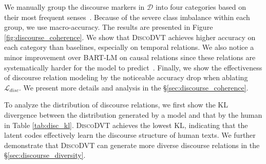 \documentclass[11pt]{article}
\begin{document}

We manually group the discourse markers in $\mathcal{D}$ into four categories based on their most frequent senses~\citep{pdtb2}. Because of the severe class imbalance within each group, we use macro-accuracy.
The results are presented in Figure \ref{fig:discourse_coherence}. We show that \textsc{DiscoDVT} achieves higher accuracy on each category than baselines, especially on temporal relations. We also notice a minor improvement over BART-LM on causal relations since these relations are systematically harder for the model to predict~\citep{DisSent}. Finally, we show the effectiveness of discourse relation modeling by the noticeable accuracy drop when ablating $\mathcal{L}_{disc}$.
We present more details and analysis in the \S{\ref{sec:discourse_coherence}}.

To analyze the distribution of discourse relations, we first show the KL divergence between the distribution generated by a model and that by the human in Table \ref{tab:disc_kl}. \textsc{DiscoDVT} achieves the lowest KL, indicating that the latent codes effectively learn the discourse structure of human texts. We further demonstrate that \textsc{DiscoDVT} can generate more diverse discourse relations in the \S{\ref{sec:discourse_diversity}}.

\end{document}
